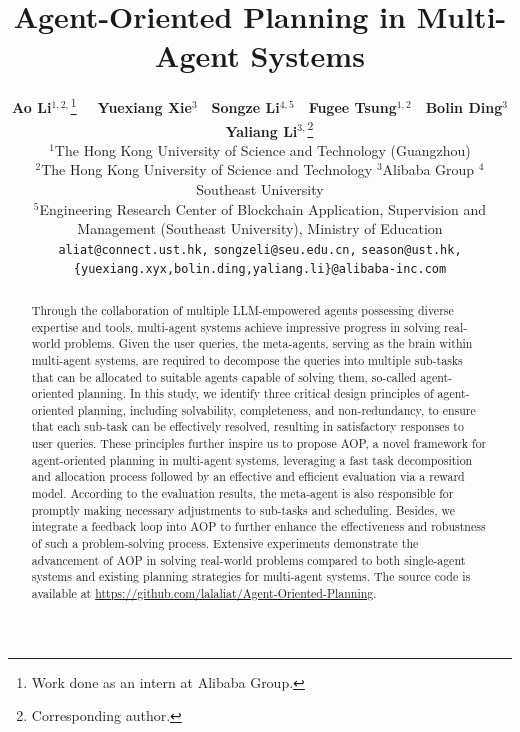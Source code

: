 \documentclass{article} %
\title{Agent-Oriented Planning in Multi-Agent Systems}
\author{\textbf{Ao Li}$^{1,2,}$\thanks{Work done as an intern at Alibaba Group.}~~~\textbf{Yuexiang Xie}$^{3}$~~\textbf{Songze Li}$^{4,5}$~~\textbf{Fugee Tsung}$^{1,2}$~~\textbf{Bolin Ding}$^{3}$~~ \textbf{Yaliang Li}$^{3,}$\thanks{Corresponding author.}\\
$^{1}$The Hong Kong University of Science and Technology (Guangzhou)\\
$^{2}$The Hong Kong University of Science and Technology $^{3}$Alibaba Group $^{4}$Southeast University \\
$^{5}$Engineering Research Center of Blockchain Application, Supervision and Management (Southeast University), Ministry of Education\\
\texttt{aliat@connect.ust.hk,} 
\texttt{songzeli@seu.edu.cn,}
\texttt{season@ust.hk,}
\texttt{\{yuexiang.xyx,bolin.ding,yaliang.li\}@alibaba-inc.com}
}
\newcommand{\name}{AOP\xspace}
\begin{document}
\maketitle

\begin{abstract}

Through the collaboration of multiple LLM-empowered agents possessing diverse expertise and tools, multi-agent systems achieve impressive progress in solving real-world problems. Given the user queries, the meta-agents, serving as the brain within multi-agent systems, are required to decompose the queries into multiple sub-tasks that can be allocated to suitable agents capable of solving them, so-called agent-oriented planning. In this study, we identify three critical design principles of agent-oriented planning, including solvability, completeness, and non-redundancy, to ensure that each sub-task can be effectively resolved, resulting in satisfactory responses to user queries. These principles further inspire us to propose \name, a novel framework for agent-oriented planning in multi-agent systems, leveraging a fast task decomposition and allocation process followed by an effective and efficient evaluation via a reward model. According to the evaluation results, the meta-agent is also responsible for promptly making necessary adjustments to sub-tasks and scheduling. Besides, we integrate a feedback loop into \name to further enhance the effectiveness and robustness of such a problem-solving process. Extensive experiments demonstrate the advancement of \name in solving real-world problems compared to both single-agent systems and existing planning strategies for multi-agent systems. The source code is available at \href{https://github.com/lalaliat/Agent-Oriented-Planning}{https://github.com/lalaliat/Agent-Oriented-Planning}.




\end{abstract}












\clearpage
\appendix

\end{document}
